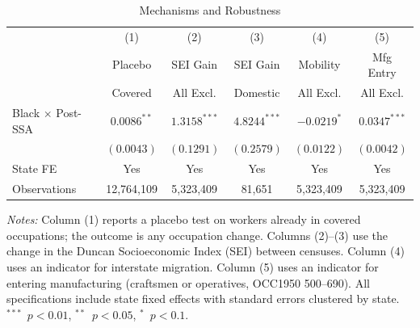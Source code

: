 \begin{table}[t]
\centering
\caption{Mechanisms and Robustness}
\label{tab:robust}
\begin{tabular}{lccccc}
\hline\hline
 & (1) & (2) & (3) & (4) & (5) \\
 & Placebo & SEI Gain & SEI Gain & Mobility & Mfg Entry \\
 & Covered & All Excl. & Domestic & All Excl. & All Excl. \\
\hline
Black $\times$ Post-SSA & $0.0086^{**}$ & $1.3158^{***}$ & $4.8244^{***}$ & $-0.0219^{*}$ & $0.0347^{***}$ \\
 & $(0.0043)$ & $(0.1291)$ & $(0.2579)$ & $(0.0122)$ & $(0.0042)$ \\
\hline
State FE & Yes & Yes & Yes & Yes & Yes \\
Observations & 12,764,109 & 5,323,409 & 81,651 & 5,323,409 & 5,323,409 \\
\hline\hline
\end{tabular}
\begin{tablenotes}
\small
\item \textit{Notes:} Column (1) reports a placebo test on workers already in covered occupations; the outcome is any occupation change. Columns (2)--(3) use the change in the Duncan Socioeconomic Index (SEI) between censuses. Column (4) uses an indicator for interstate migration. Column (5) uses an indicator for entering manufacturing (craftsmen or operatives, OCC1950 500--690). All specifications include state fixed effects with standard errors clustered by state. $^{***}$~$p<0.01$, $^{**}$~$p<0.05$, $^{*}$~$p<0.1$.
\end{tablenotes}
\end{table}
